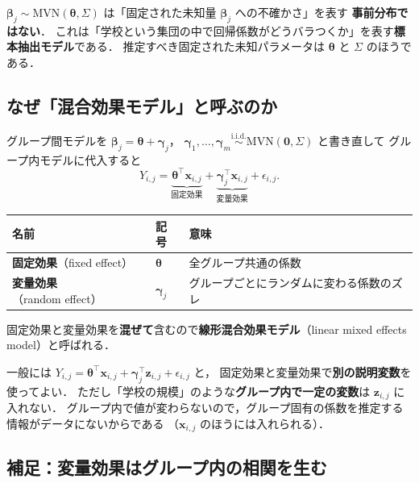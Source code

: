 \documentclass[lualatex,ja=standard,a4paper,12pt]{bxjsarticle}
\newcommand{\mvn}{\mathrm{MVN}}
\begin{document}
\begin{warningbox}
$\bm{\beta}_j \sim \mvn(\bm{\theta}, \Sigma)$ は「固定された未知量 $\bm{\beta}_j$ への不確かさ」を表す
\textbf{事前分布ではない}．
これは「学校という集団の中で回帰係数がどうバラつくか」を表す\textbf{標本抽出モデル}である．
推定すべき固定された未知パラメータは $\bm{\theta}$ と $\Sigma$ のほうである．
\end{warningbox}

\subsection{なぜ「混合効果モデル」と呼ぶのか}

グループ間モデルを $\bm{\beta}_j = \bm{\theta} + \bm{\gamma}_j$，
$\bm{\gamma}_1, \ldots, \bm{\gamma}_m \overset{\text{i.i.d.}}{\sim} \mvn(\bm{0}, \Sigma)$ と書き直して
グループ内モデルに代入すると
\[
  Y_{i,j} = \underbrace{\bm{\theta}^\top \bm{x}_{i,j}}_{\text{固定効果}}
          + \underbrace{\bm{\gamma}_j^\top \bm{x}_{i,j}}_{\text{変量効果}}
          + \epsilon_{i,j}.
\]

\begin{center}
\renewcommand{\arraystretch}{1.5}
\begin{tabular}{lll}
\toprule
名前 & 記号 & 意味 \\
\midrule
\textbf{固定効果}（fixed effect） & $\bm{\theta}$ & 全グループ共通の係数 \\
\textbf{変量効果}（random effect） & $\bm{\gamma}_j$ & グループごとにランダムに変わる係数のズレ \\
\bottomrule
\end{tabular}
\end{center}

\noindent 固定効果と変量効果を\textbf{混ぜて}含むので\textbf{線形混合効果モデル}（linear mixed effects model）と呼ばれる．

\begin{pointbox}
一般には $Y_{i,j} = \bm{\theta}^\top \bm{x}_{i,j} + \bm{\gamma}_j^\top \bm{z}_{i,j} + \epsilon_{i,j}$ と，
固定効果と変量効果で\textbf{別の説明変数}を使ってよい．
ただし「学校の規模」のような\textbf{グループ内で一定の変数}は $\bm{z}_{i,j}$ に入れない．
グループ内で値が変わらないので，グループ固有の係数を推定する情報がデータにないからである
（$\bm{x}_{i,j}$ のほうには入れられる）．
\end{pointbox}

\subsection*{補足：変量効果はグループ内の相関を生む}
\end{document}
